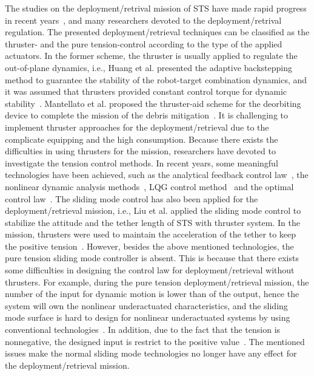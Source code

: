 \documentclass[conference]{IEEEtran}
\theoremstyle{plain}
\begin{document}
The studies on the deployment/retrival mission of STS have made rapid progress in recent years~\cite{cai2014deployment,ma2014coordinated,jung2015nonlinear,li2016libration}, and many researchers devoted to the deployment/retrival regulation. The presented deployment/retrieval techniques can be classified as the thruster- and the pure tension-control according to the type of the applied actuators. In the former scheme, the thruster is usually applied to regulate the out-of-plane dynamics, i.e., Huang et al. presented the adaptive backstepping method to guarantee the stability of the robot-target combination dynamics, and it was assumed that thrusters provided constant control torque for dynamic stability~\cite{huang2015adaptive}. Mantellato et al. proposed the thruster-aid scheme for the deorbiting device to complete the mission of the debris mitigation~\cite{mantellato2015thrust}. It is  challenging to implement thruster approaches for the deployment/retrieval due to the complicate equipping and the high consumption. Because there exists the difficulties in using thrusters for the mission, researchers have devoted to investigate the tension control methods. In recent years, some meaningful technologies have been achieved, such as the analytical feedback control law~\cite{wen2015space}, the nonlinear dynamic analysis methods~\cite{jung2015nonlinear}, LQG control method~\cite{yousefian2015anti} and the optimal control law~\cite{steindl2015optimal}. The sliding mode control has also been applied for the deployment/retrieval mission, i.e., Liu et al. applied the sliding mode control to stabilize the attitude and the tether length of STS with thruster system. In the mission, thrusters were used to maintain the acceleration of the tether to keep the positive tension~\cite{yingying2012variable}. However, besides the above mentioned technologies, the pure tension sliding mode controller is absent. This is because that there exists some difficulties in designing the control law for deployment/retrieval without thrusters. For example, during the pure tension deployment/retrieval mission, the number of the input for dynamic motion is lower than of the output, hence the system will own the nonlinear underactuated characteristics, and the sliding mode surface is hard to design for nonlinear underactuated systems by using conventional technologies~\cite{edwards2006advances}. In addition, due to the fact that the tension is nonnegative, the designed input is restrict to the positive value~\cite{yingying2012variable}. The mentioned issues make the normal sliding mode technologies no longer have any effect for the deployment/retrieval mission.\par
\end{document}

